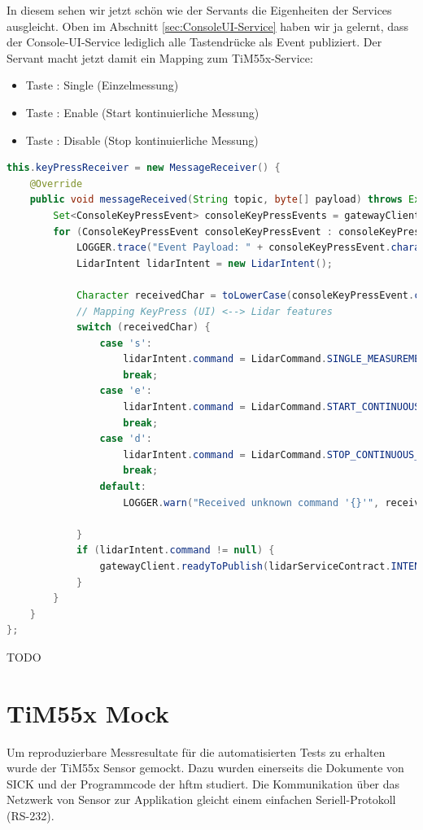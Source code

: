 In diesem  sehen wir jetzt schön wie der Servants die Eigenheiten der Services ausgleicht. Oben im Abschnitt \ref{sec:ConsoleUI-Service} haben wir ja gelernt, dass der Console-UI-Service lediglich alle Tastendrücke als Event publiziert. Der Servant macht jetzt damit ein Mapping zum TiM55x-Service:
\begin{itemize}
	\item Taste : Single (Einzelmessung)
	\item Taste : Enable (Start kontinuierliche Messung)
	\item Taste : Disable (Stop kontinuierliche Messung)
\end{itemize}
\begin{lstlisting}[language=Java,caption={MessageReceiver für die keyPress-Evemts einer ConsoleUI-Instanz im Servant},label={lst:servant-uiConnectionStatusReceiver}]
this.keyPressReceiver = new MessageReceiver() {
    @Override
    public void messageReceived(String topic, byte[] payload) throws Exception {
        Set<ConsoleKeyPressEvent> consoleKeyPressEvents = gatewayClient.toMessageSet(payload, ConsoleKeyPressEvent.class);
        for (ConsoleKeyPressEvent consoleKeyPressEvent : consoleKeyPressEvents) {
            LOGGER.trace("Event Payload: " + consoleKeyPressEvent.character);
            LidarIntent lidarIntent = new LidarIntent();

            Character receivedChar = toLowerCase(consoleKeyPressEvent.character);
            // Mapping KeyPress (UI) <--> Lidar features
            switch (receivedChar) {
                case 's':
                    lidarIntent.command = LidarCommand.SINGLE_MEASUREMENT;
                    break;
                case 'e':
                    lidarIntent.command = LidarCommand.START_CONTINUOUS_MEASUREMENT;
                    break;
                case 'd':
                    lidarIntent.command = LidarCommand.STOP_CONTINUOUS_MEASUREMENT;
                    break;
                default:
                    LOGGER.warn("Received unknown command '{}'", receivedChar);

            }
            if (lidarIntent.command != null) {
                gatewayClient.readyToPublish(lidarServiceContract.INTENT, lidarIntent);
            }
        }
    }
};
\end{lstlisting}
TODO

\section{TiM55x Mock}
\label{chap:tim-mock}
Um reproduzierbare Messresultate für die automatisierten Tests zu erhalten wurde der TiM55x Sensor gemockt. Dazu wurden einerseits die Dokumente von SICK und der Programmcode der \acrshort{hftm} studiert. Die Kommunikation über das Netzwerk von Sensor zur Applikation gleicht einem einfachen Seriell-Protokoll (RS-232).

